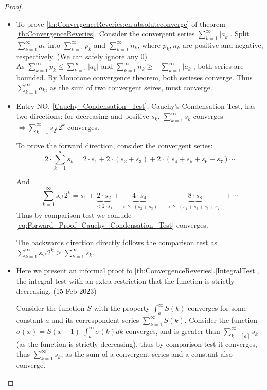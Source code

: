 \documentclass[../note.tex]{subfiles}
\begin{document}
\begin{proof}

\begin{itemize}
	\item 
	To prove \ref{th:ConvergenceReveries:en:absoluteconverge} of theorem \ref{th:ConvergenceReveries},
	Consider the convergent series $\sum^{\infty}_{k=1}|a_k|$.
	Split $\sum^{\infty}_{k=1}a_k$ into $\sum^{\infty}_{k=1}p_k$ and $\sum^{\infty}_{k=1}n_k$, where $p_k, n_k$ are positive and negative, respectively. (We can safely ignore any 0)\\
	As $\sum^{\infty}_{k=1}p_k \leq \sum^{\infty}_{k=1}|a_k| $ and $\sum^{\infty}_{k=1}n_k \geq -\sum^{\infty}_{k=1}|a_k|$, both series are bounded. By Monotone convergence theorem, both serieses converge.
	Thus $\sum^{\infty}_{k=1}a_k$, as the sum of two convergent seires, must converge.

	\item
	Entry NO. \ref{Cauchy_Condensation_Test}, Cauchy's Condensation Test, has two directions: for decreasing and positive $s_k$, $\sum^{\infty}_{k=1}s_k$ converges $\iff \sum^{\infty}_{k=1}s_{2^k}2^k$ converges.

	To prove the forward direction, consider the convergent series:
	\[
		2\cdot \sum^{\infty}_{k=1}s_k =
		2\cdot s_1 + 2 \cdot (s_2+s_3) + 2 \cdot (s_4+s_5+s_6+s_7) \cdots
	\]

	And 
	\begin{equation} \label{eq:Forward_Proof_Cauchy_Condensation_Test}
		\sum^{\infty}_{k=1}s_{2^k}2^k = s_1+\underbrace{2\cdot s_2}_{<2\cdot s_1}
		+ \underbrace{4\cdot s_4}_{<2\cdot (s_2+s_3)}
		+ \underbrace{8\cdot s_8}_{<2\cdot (s_4+s_5+s_6+s_7)} + \cdots
	\end{equation}
	Thus by comparison test we conlude \eqref{eq:Forward_Proof_Cauchy_Condensation_Test} converges. 
	
	The backwards direction directly follows the comparison test as\\ $ \sum^{\infty}_{k=1}s_{2^k}2^k \geq \sum^{\infty}_{k=1}s_k$.
	\item 
		Here we present an informal proof fo \ref{th:ConvergenceReveries}.\ref{IntegralTest}, the integral test with an extra restriction that the function is strictly decreasing. (15 Feb 2023)

		Consider the function $S$ with the property $\int_{a}^{\infty}S(k)$ converges for some constant $a$ and its correspondent series 
		$\sum^{\infty}_{k=1}S(k)$. 
		Consider the function $\sigma (x) = S(x-1)$ $\int_{a}^{\infty}\sigma(k)dk$ converges, and is greater than $\sum^{\infty}_{k=\left\lceil{a}\right\rceil}s_k$(as the function is strictly decreasing), thus by comparison test it converges,
		thus $\sum^{\infty}_{k=1}s_k$, as the sum of a convergent series and a constant also converge.
\end{itemize}
\end{proof}
\end{document}
